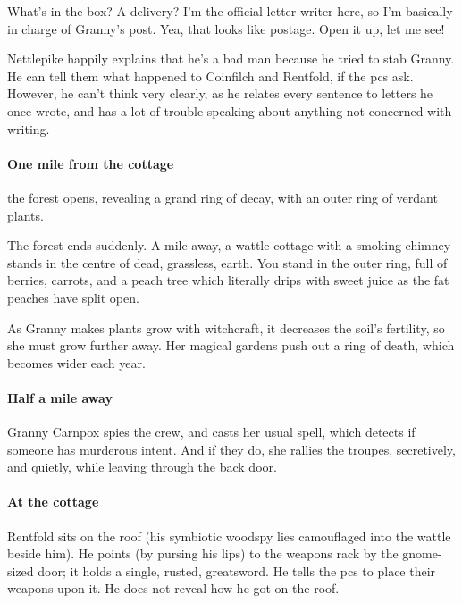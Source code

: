 \documentclass[10pt,twoside]{book}
\begin{document}
\begin{speechtext}
  What's in the box?
  A delivery?
  I'm the official letter writer here, so I'm basically in charge of Granny's post.
  Yea, that looks like postage.
  Open it up, let me see!
\end{speechtext}

Nettlepike happily explains that he's a bad man because he tried to stab Granny.
He can tell them what happened to Coinfilch and Rentfold, if the \glspl{pc} ask.
However, he can't think very clearly, as he relates every sentence to letters he once wrote, and has a lot of trouble speaking about anything not concerned with writing.

\paragraph{One mile from the cottage}
the forest opens, revealing a grand ring of decay, with an outer ring of verdant plants.

\begin{boxtext}
  The forest ends suddenly.
  A mile away, a wattle cottage with a smoking chimney stands in the centre of dead, grassless, earth.
  You stand in the outer ring, full of berries, carrots, and a peach tree which literally drips with sweet juice as the fat peaches have split open.
\end{boxtext}

\begin{exampletext}
  As Granny makes plants grow with witchcraft, it decreases the soil's fertility, so she must grow further away.
  Her magical gardens push out a ring of death, which becomes wider each year.
\end{exampletext}

\paragraph{Half a mile away}
Granny Carnpox spies the crew, and casts her usual \gls{spell}, which detects if someone has murderous intent.
And if they do, she rallies the troupes, secretively, and quietly, while leaving through the back door.

\paragraph{At the cottage}
Rentfold sits on the roof (his symbiotic \gls{woodspy} lies camouflaged into the wattle beside him).
He points (by pursing his lips) to the weapons rack by the gnome-sized door; it holds a single, rusted, greatsword.
He tells the \glspl{pc} to place their weapons upon it.
He does not reveal how he got on the roof.
\end{document}
